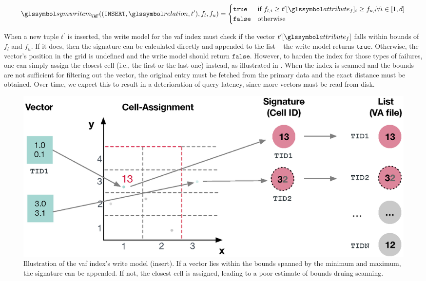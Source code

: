 \begin{equation}
    \label{equation:write_model_insert_vaf}
    \symwritem_{\mathtt{VAF}}((\mathtt{INSERT}, \relation, t^{\prime}),f_{l},f_{u}) =
    \begin{cases}
        \mathtt{true} & \text{if } f_{l,i} \geq t^{\prime}[\attribute_f]_i \geq f_{u,i} \forall i \in [1,d]\\
        \mathtt{false} & \text{otherwise}
    \end{cases}
\end{equation}

When a new tuple $t^{\prime}$ is inserted, the write model for the \acrshort{vaf} index must check if the vector $t^{\prime}[\attribute_f]$ falls within bounds of $f_{l}$ and $f_{u}$. If it does, then the signature can be calculated directly and appended to the list -- the write model returns $\mathtt{true}$. Otherwise, the vector's position in the grid is undefined and the write model should return $\mathtt{false}$. However, to harden the index for those types of failures, one can simply assign the closest cell (i.e., the first or the last one) instead, as illustrated in . When the index is scanned and the bounds are not sufficient for filtering out the vector, the original entry must be fetched from the primary data and the exact distance must be obtained. Over time, we expect this to result in a deterioration of query latency, since more vectors must be read from disk.

\begin{figure}
    \centering
    \includegraphics[width=\textwidth]{figures/vaf-write-model}
    \caption{Illustration of the \acrshort{vaf} index's write model (insert). If a vector lies within the bounds spanned by the minimum and maximum, the signature can be appended. If not, the closest cell is assigned, leading to a poor estimate of bounds druing scanning.}
    \label{figure:write_model_insert_vaf}
\end{figure}

